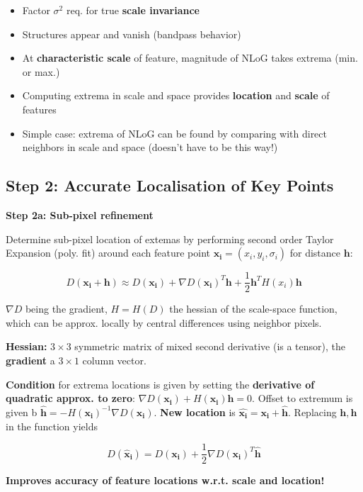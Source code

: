 \begin{itemize}
    \item Factor $\sigma^2$ req. for true \textbf{scale invariance}
    \item Structures appear and vanish (bandpass behavior)
    \item At \textbf{characteristic scale} of feature, magnitude of NLoG takes extrema (min. or max.)
    \item Computing extrema in scale and space provides \textbf{location} and \textbf{scale} of features
    \item Simple case: extrema of NLoG can be found by comparing with direct neighbors in scale and space (doesn't have to be this way!)
\end{itemize}

\subsection{Step 2: Accurate Localisation of Key Points}

\textbf{Step 2a: Sub-pixel refinement}

Determine sub-pixel location of extemas by performing second order Taylor Expansion (poly. fit) around each feature point $\mathbf{x_i} = (x_i, y_i, \sigma_i)$ for distance $\mathbf{h}$:

$$D(\mathbf{x_i} + \mathbf{h}) \approx D(\mathbf{x_i}) + \nabla D(\mathbf{x_i})^T \mathbf{h} + \frac{1}{2} \mathbf{h}^T H(x_i) \mathbf{h}$$

$\nabla D$ being the gradient, $H = H(D)$ the hessian of the scale-space function, which can be approx. locally by central differences using neighbor pixels.

\textbf{Hessian:} $3\times 3$ symmetric matrix of mixed second derivative (is a tensor), the \textbf{gradient} a $3\times 1$ column vector.

\textbf{Condition} for extrema locations is given by setting the \textbf{derivative of quadratic approx. to zero}: $ \nabla D(\mathbf{x_i}) + H(\mathbf{x_i}) \mathbf{h} = 0$. Offset to extremum is given b $\hat{\mathbf{h}} = - H(\mathbf{x_i})^{-1} \nabla D(\mathbf{x_i})$. \textbf{New location} is $\hat{\mathbf{x_i}} = \mathbf{x_i + \hat{h}}$. Replacing $\mathbf{h, \hat{h}}$ in the function yields

$$D(\mathbf{\hat{x}_i}) = D(\mathbf{x_i}) + \frac{1}{2} \nabla D(\mathbf{x_i})^T \mathbf{\hat{h}}$$

\textbf{Improves accuracy of feature locations w.r.t. scale and location!}

